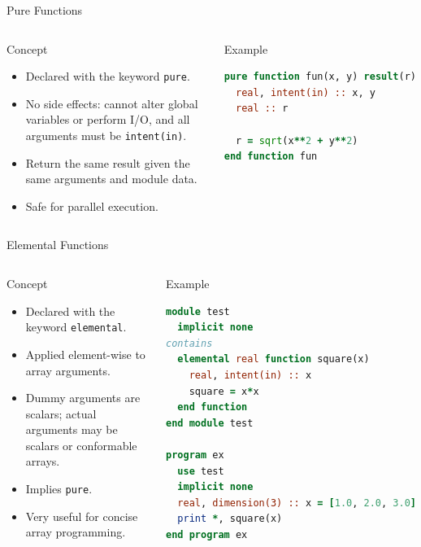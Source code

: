 \begin{frame}[fragile]{Pure Functions}
  \begin{columns}[T]
    \begin{block}{Concept}
      \begin{itemize}
        \item Declared with the keyword \texttt{pure}.
        \item No side effects: cannot alter global variables
              or perform I/O, and all arguments must be
              \texttt{intent(in)}.
        \item Return the same result given the same
              arguments and module data.
        \item Safe for parallel execution.
      \end{itemize}
    \end{block}

    \begin{block}{Example}
\begin{lstlisting}[language=Fortran]
pure function fun(x, y) result(r)
  real, intent(in) :: x, y
  real :: r

  r = sqrt(x**2 + y**2)
end function fun
\end{lstlisting}
    \end{block}
  \end{columns}
\end{frame}

\begin{frame}[fragile]{Elemental Functions}
  \begin{columns}[T]
    \begin{block}{Concept}
      \begin{itemize}
        \item Declared with the keyword \texttt{elemental}.
        \item Applied element-wise to array arguments.
        \item Dummy arguments are scalars; actual arguments may be scalars or conformable arrays.
        \item Implies \texttt{pure}.
        \item Very useful for concise array programming.
      \end{itemize}
    \end{block}

    \begin{block}{Example}
\begin{lstlisting}[language=Fortran]
module test
  implicit none
contains
  elemental real function square(x)
    real, intent(in) :: x
    square = x*x
  end function
end module test

program ex
  use test
  implicit none
  real, dimension(3) :: x = [1.0, 2.0, 3.0]
  print *, square(x)
end program ex
\end{lstlisting}

    \end{block}
  \end{columns}
\end{frame}


